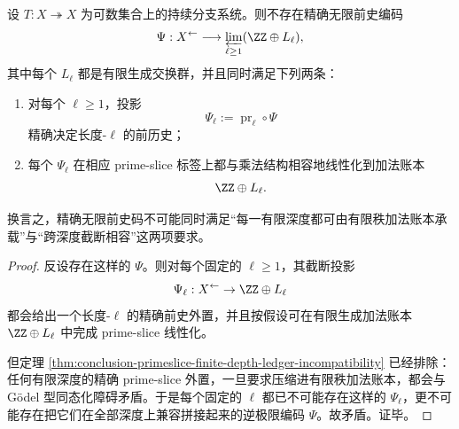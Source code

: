 \begin{theorem}[不存在与有限深度截断相容的有限秩加法账本化]\label{thm:conclusion-no-truncation-compatible-finite-rank-additive-ledger-for-exact-history}
设 \(T:X\twoheadrightarrow X\) 为可数集合上的持续分支系统。则不存在精确无限前史编码
\[
\Psi:X^{\leftarrow}\longrightarrow \varprojlim_{\ell\ge 1}(\ZZ\oplus L_\ell),
\]
其中每个 \(L_\ell\) 都是有限生成交换群，并且同时满足下列两条：
\begin{enumerate}
  \item 对每个 \(\ell\ge 1\)，投影
        \[
        \Psi_\ell:=\operatorname{pr}_\ell\circ \Psi
        \]
        精确决定长度-\(\ell\) 的前历史；
  \item 每个 \(\Psi_\ell\) 在相应 prime-slice 标签上都与乘法结构相容地线性化到加法账本
        \[
        \ZZ\oplus L_\ell.
        \]
\end{enumerate}
换言之，精确无限前史码不可能同时满足“每一有限深度都可由有限秩加法账本承载”与“跨深度截断相容”这两项要求。
\end{theorem}
\begin{proof}
反设存在这样的 \(\Psi\)。则对每个固定的 \(\ell\ge 1\)，其截断投影
\[
\Psi_\ell:X^{\leftarrow}\to \ZZ\oplus L_\ell
\]
都会给出一个长度-\(\ell\) 的精确前史外置，并且按假设可在有限生成加法账本 \(\ZZ\oplus L_\ell\) 中完成 prime-slice 线性化。

但定理 \ref{thm:conclusion-primeslice-finite-depth-ledger-incompatibility} 已经排除：任何有限深度的精确 prime-slice 外置，一旦要求压缩进有限秩加法账本，都会与 Gödel 型同态化障碍矛盾。于是每个固定的 \(\ell\) 都已不可能存在这样的 \(\Psi_\ell\)，更不可能存在把它们在全部深度上兼容拼接起来的逆极限编码 \(\Psi\)。故矛盾。证毕。
\end{proof}
